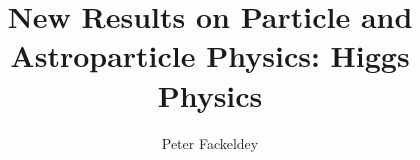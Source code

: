 \documentclass[a4paper,10pt,twoside,hyperpdf,fleqn]{hepthesis}
\title{New Results on Particle and Astroparticle Physics: Higgs Physics}
\author{Peter Fackeldey}
\begin{document}
\begin{frontmatter}
  
\end{frontmatter}

\begin{mainmatter}

  
  
  
  
\end{mainmatter}




\end{document}
